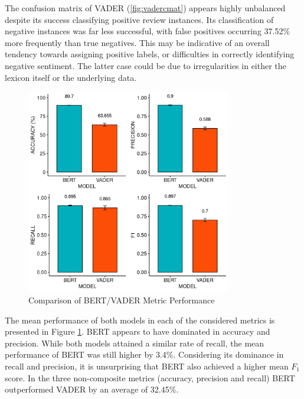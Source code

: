 \documentclass{csfourzero}
\begin{document}
\par
The confusion matrix of VADER (\ref{fig:vadercmat}) appears highly unbalanced despite its success classifying positive review instances. Its classification of negative instances was far less successful, with false positives occurring 37.52\% more frequently than true negatives. This may be indicative of an overall tendency towards assigning positive labels, or difficulties in correctly identifying negative sentiment. The latter case could be due to irregularities in either the lexicon itself or the underlying data.
\par

\begin{figure}[H]
    \centering
    \includegraphics[width=0.8\textwidth]{img/metric_charts.png}
    \caption{Comparison of BERT/VADER Metric Performance}
    \label{fig:metriccharts}
\end{figure}

\par
The mean performance of both models in each of the considered metrics is presented in Figure \ref{fig:metriccharts}. BERT appears to have dominated in accuracy and precision. While both models attained a similar rate of recall, the mean performance of BERT was still higher by 3.4\%. Considering its dominance in recall and precision, it is unsurprising that BERT also achieved a higher mean $F_1$ score. In the three non-composite metrics (accuracy, precision and recall) BERT outperformed VADER by an average of 32.45\%.
\par
\end{document}
